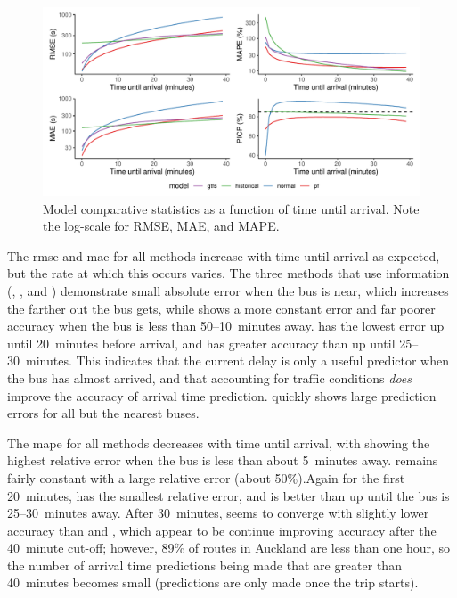 \begin{knitrout}\small
{}\color{fgcolor}\begin{figure}
\includegraphics[width=\textwidth]{figure/model_results_rmse_time-1} \caption[Model comparative statistics as a function of time until arrival]{Model comparative statistics as a function of time until arrival. Note the log-scale for RMSE, MAE, and MAPE.}\label{fig:model_results_rmse_time}
\end{figure}


\end{knitrout}


The \gls{rmse} and \gls{mae} for all methods increase with time until arrival as expected, but the rate at which this occurs varies. The three methods that use \rt{} information (\Fpf{}, \Fnorm{}, and \Fsched{}) demonstrate small absolute error when the bus is near, which increases the farther out the bus gets, while \Fhist{} shows a more constant error and far poorer accuracy when the bus is less than 50--10~minutes away. \Fpf{} has the lowest error up until 20~minutes before arrival, and has greater accuracy than \Fsched{} up until 25--30~minutes. This indicates that the current delay is only a useful predictor when the bus has almost arrived, and that accounting for \rt{} traffic conditions \emph{does} improve the accuracy of arrival time prediction. \Fnorm{} quickly shows large prediction errors for all but the nearest buses.




The \gls{mape} for all methods decreases with time until arrival, with \Fhist{} showing the highest relative error when the bus is less than about 5~minutes away. \Fnorm{} remains fairly constant with a large relative error (about 50\%).Again for the first 20~minutes, \Fpf{} has the smallest relative error, and is better than \Fsched{} up until the bus is 25--30~minutes away. After 30~minutes, \Fpf{} seems to converge with slightly lower accuracy than \Fhist{} and \Fsched{}, which appear to be continue improving accuracy after the 40~minute cut-off; however, 89\% of routes in Auckland are less than one hour, so the number of arrival time predictions being made that are greater than 40~minutes becomes small (predictions are only made once the trip starts).


